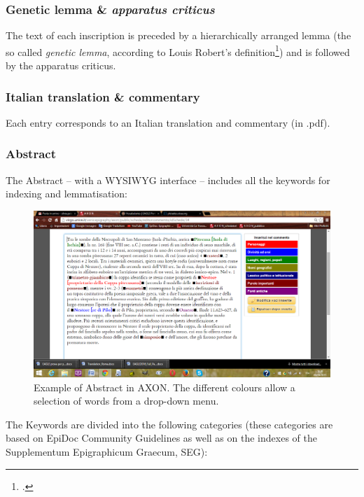 \documentclass[amsthm,ebook]{saparticle}
\begin{document}
\subsubsection{Genetic lemma \& \emph{apparatus criticus}}


\noindent The text of each inscription is preceded by a hierarchically arranged lemma (the so called \emph{genetic lemma}, according to
Louis Robert’s definition\footnote{\citet{robert_carie:_1954}.}) and is followed by the apparatus criticus.




\subsubsection{Italian translation \& commentary}


\noindent Each entry corresponds to an Italian translation and commentary (in .pdf). 




\subsubsection{Abstract}


\noindent The Abstract – with a WYSIWYG interface – includes all the keywords for indexing and lemmatisation:

\begin{figure}[!hbp]
\centering
 \includegraphics[width=\columnwidth]{EAGLE2016FullPaperrevised-img002.png}
\caption{Example of Abstract in AXON. The different colours allow a selection of words from a drop-down menu. }
\label{fig:2}
\end{figure}




The Keywords are divided into the following categories (these categories are based on EpiDoc Community Guidelines as
well as on the indexes of the Supplementum Epigraphicum Graecum, SEG):
\end{document}
